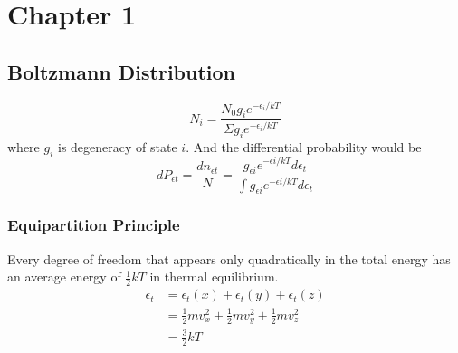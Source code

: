\documentclass[letterpaper]{article}
\begin{document}
\newpage
\section*{Chapter 1}
\subsection*{Boltzmann Distribution}
\begin{equation*}
    N_i=\frac{N_0 g_i e^{-\epsilon_i/kT}}{\Sigma g_i e^{-\epsilon_i/kT}}
\end{equation*}
where $g_i$ is degeneracy of state $i$.
And the differential probability would be
\begin{equation*}
    dP_{\epsilon t} = \frac{dn_{\epsilon t}}{N} = \frac{g_{\epsilon i} e^{-\epsilon i/kT}
    d\epsilon_t}{\int g_{\epsilon i} e^{-\epsilon i/kT}d\epsilon_t}
\end{equation*}
\subsubsection*{Equipartition Principle}
Every degree of freedom that appears only quadratically in the total energy has an average 
energy of $\frac{1}{2}kT$ in thermal equilibrium.
\begin{equation*}
    \begin{aligned}
        \epsilon _t &= \epsilon _t(x) + \epsilon _t(y) + \epsilon _t(z) \\
        &= \frac{1}{2}mv_x^2 + \frac{1}{2}mv_y^2 + \frac{1}{2}mv_z^2 \\
        &= \frac{3}{2}kT
    \end{aligned}
\end{equation*}
\end{document}
